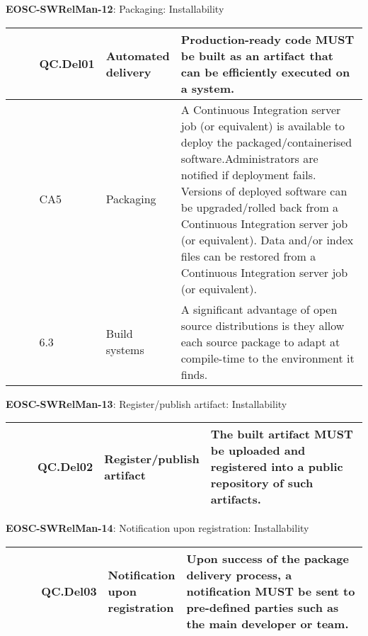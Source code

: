 \textbf{EOSC-SWRelMan-12}: Packaging: Installability
\nopagebreak[4]
\begin{center}
    \tabletail{\hline}
    \tiny
    \begin{supertabular}{|p{0.10\linewidth}|p{0.10\linewidth}|p{0.20\linewidth}|p{0.60\linewidth}|} \hline
        \cite{orviz_set_2017} & QC.Del01 & Automated delivery & Production-ready code MUST be built as an artifact that can be efficiently executed on a system.\\ \hline
        \cite{shepherdson_cessda_2019} & CA5 & Packaging & A Continuous Integration server job (or equivalent) is available to deploy the packaged/containerised software.Administrators are notified if deployment fails. Versions of deployed software can be upgraded/rolled back from a Continuous Integration server job (or equivalent). Data and/or index files can be restored from a Continuous Integration server job (or equivalent).\\ \hline
        \cite{raymond_software_2013} & 6.3 & Build systems & A significant advantage of open source distributions is they allow each source package to adapt at compile-time to the environment it finds.\\ \hline
    \end{supertabular}
\end{center}

\textbf{EOSC-SWRelMan-13}: Register/publish artifact: Installability
\nopagebreak[4]
\begin{center}
    \tabletail{\hline}
    \tiny
    \begin{supertabular}{|p{0.10\linewidth}|p{0.10\linewidth}|p{0.20\linewidth}|p{0.60\linewidth}|} \hline
        \cite{orviz_set_2017} & QC.Del02 & Register/publish artifact & The built artifact MUST be uploaded and registered into a public repository of such artifacts.\\ \hline
    \end{supertabular}
\end{center}

\textbf{EOSC-SWRelMan-14}: Notification upon registration: Installability
\nopagebreak[4]
\begin{center}
    \tabletail{\hline}
    \tiny
    \begin{supertabular}{|p{0.10\linewidth}|p{0.10\linewidth}|p{0.20\linewidth}|p{0.60\linewidth}|} \hline
        \cite{orviz_set_2017} & QC.Del03 & Notification upon registration & Upon success of the package delivery process, a notification MUST be sent to pre-defined parties such as the main developer or team.\\ \hline
    \end{supertabular}
\end{center}


